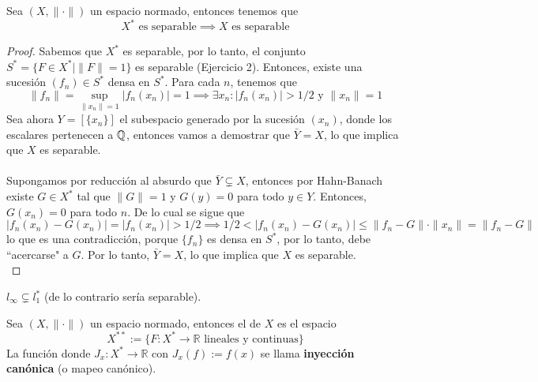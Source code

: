 \begin{teo}\label{teo:separable-dual-separable}
    Sea $(X, \|\cdot\|)$ un espacio normado, entonces tenemos que 
    \begin{equation*}
        X^* \text{ es separable} \implies X \text{ es separable}
    \end{equation*}

\begin{proof}
    Sabemos que $X^*$ es separable, por lo tanto, el conjunto $S^* = \{ F \in X^* \mid \|F\| = 1 \}$ es separable (Ejercicio 2). Entonces, existe una sucesión $(f_n) \in S^*$ densa en $S^*$. Para cada $n$, tenemos que 
    \begin{equation*}
        \|f_n\| = \sup_{\|x_n\|=1} |f_n(x_n)| = 1 \implies \exists x_n : |f_n(x_n)| > 1/2 \text{ y } \|x_n\| = 1
    \end{equation*}
    Sea ahora $Y = [\{x_n\}]$ el subespacio generado por la sucesión $(x_n)$, donde los escalares pertenecen a $\mathbb{Q}$, entonces vamos a demostrar que $\bar{Y} = X$, lo que implica que $X$ es separable. \\ \\
    \noindent
    Supongamos por reducción al absurdo que $\bar{Y} \subsetneq X$, entonces por Hahn-Banach existe $G \in X^*$ tal que $\|G\| = 1$ y $G(y) = 0$ para todo $y \in Y$. Entonces, $G(x_n) = 0$ para todo $n$. De lo cual se sigue que
    \begin{equation*}
        |f_n(x_n) - G(x_n)| = |f_n(x_n)| > 1/2 \implies 1/2 < |f_n(x_n) - G(x_n)| \leq \|f_n - G\| \cdot \|x_n\| = \|f_n - G\|
    \end{equation*}
    lo que es una contradicción, porque $\{f_n\}$ es densa en $S^*$, por lo tanto, debe ``acercarse" a $G$. Por lo tanto, $\bar{Y} = X$, lo que implica que $X$ es separable. \\
\end{proof}
\end{teo}

\begin{coro}
    $l_\infty \subsetneq l_1^*$ (de lo contrario sería separable).
\end{coro}

\begin{definicion}
    Sea $(X, \|\cdot\|)$ un espacio normado, entonces el  de $X$ es el espacio 
    $$X^{**} := \{ F: X^* \to \mathbb{R} \text{ lineales y continuas} \}$$
    La función 
    donde $J_x: X^* \to \mathbb{R}$ con $J_x(f) := f(x)$ se llama \textbf{inyección canónica} (o mapeo canónico).
\end{definicion}

